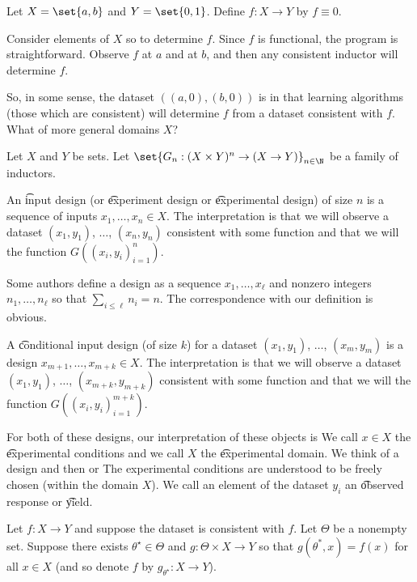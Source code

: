 

Let $X = \set{a, b}$ and $Y = \set{0, 1}$. Define $f: X \to Y$ by $f \equiv 0$.

Consider  elements of $X$ so to determine $f$.
Since $f$ is functional, the program is straightforward.
Observe $f$ at $a$ and at $b$, and then any consistent inductor will determine $f$.

So, in some sense, the dataset $((a,0), (b,0))$ is  in that  learning algorithms (those which are consistent) will determine $f$ from a dataset consistent with $f$.
What of more general domains $X$?


Let $X$ and $Y$ be sets.
Let $\set{G_n: (X \times Y)^n \to (X \to Y)}_{n \in \N}$ be a family of inductors.

An \t{input design} (or \t{experiment design} or \t{experimental design}) of size $n$ is a sequence of inputs $x_1, \dots, x_n \in X$.
The interpretation is that we will observe a dataset $(x_1, y_1)$, $\dots$, $(x_n, y_n)$ consistent with some function and that we will  the function $G((x_i,y_i)_{i = 1}^{n})$.

Some authors define a design as a sequence $x_1, \dots, x_\ell$ and nonzero integers $n_1, \dots, n_{\ell}$ so that $\sum_{i \leq \ell} n_i = n$.
The correspondence with our definition is obvious.

A \t{conditional input design} (of size $k$) for a dataset $(x_1,y_1)$, $\dots$, $(x_m, y_m)$ is a design $x_{m+1}, \dots, x_{m+k} \in X$.
The interpretation is that we will observe a dataset $(x_1, y_1)$, $\dots$, $(x_{m+k}, y_{m+k})$ consistent with some function and that we will  the function $G((x_i,y_i)_{i = 1}^{m+k})$.

For both of these designs, our interpretation of these objects is  
We call $x \in X$ the \t{experimental conditions} and we call $X$ the \t{experimental domain}.
We think of  a design and then  or 
The experimental conditions are understood to be freely chosen (within the domain $X$).
We call an element of the dataset $y_i$ an \t{observed response} or \t{yield}.


Let $f: X \to Y$ and suppose the dataset is consistent with $f$.
Let $\Theta$ be a nonempty set.
Suppose there exists $\theta^\star \in \Theta$ and $g: \Theta \times X \to Y$ so that $g(\theta^*, x) = f(x)$ for all $x \in X$ (and so denote $f$ by $g_{\theta^{\star}}: X \to Y$).

